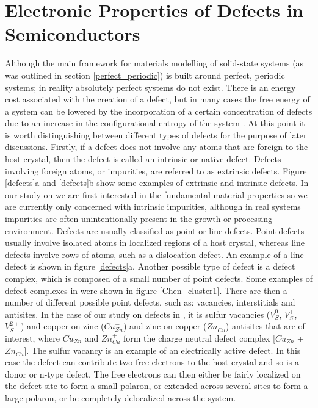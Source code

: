 \section{Electronic Properties of Defects in Semiconductors}
Although the main framework for materials modelling of solid-state systems (as was outlined in section \ref{perfect_periodic}) is built around perfect, periodic systems; in reality absolutely perfect systems do not exist. There is an energy cost associated with the creation of a defect, but in many cases the free energy of a system can be lowered by the incorporation of a certain concentration of defects due to an increase in the configurational entropy of the system \cite{AshcroftMermin_general}. 
At this point it is worth distinguishing between different types of defects for the purpose of later discussions.
Firstly, if a defect does not involve any atoms that are foreign to the host crystal, then the defect is called an intrinsic or native defect. Defects involving foreign atoms, or impurities, are referred to as extrinsic defects. Figure \ref{defects}a and \ref{defects}b show some examples of extrinsic and intrinsic defects. In our study on {\CZTS} we are first interested in the fundamental material properties so we are currently only concerned with intrinsic impurities, although in real systems impurities are often unintentionally present in the growth or processing environment.
Defects are usually classified as point or line defects. Point defects usually involve isolated atoms in localized regions of a host crystal, whereas line defects involve rows of atoms, such as a dislocation defect. An example of a line defect is shown in figure \ref{defects}a. Another possible type of defect is a defect complex, which is composed of a small number of point defects. Some examples of defect complexes in {\CZTS} were shown in figure \ref{Chen_cluster1}. 
There are then a number of different possible point defects, such as: vacancies, interstitials and antisites. In the case of our study on defects in {\CZTS}, it is sulfur vacancies ($V_{S}^{0}$, $V_{S}^{+}$, $V_{S}^{2+}$) and copper-on-zinc ($Cu_{Zn}^{-}$) and zinc-on-copper ($Zn_{Cu}^{+}$) antisites that are of interest, where  $Cu_{Zn}^{-}$ and $Zn_{Cu}^{+}$ form the charge neutral defect complex [$Cu_{Zn}^{-}$ + $Zn_{Cu}^{+}$]. The sulfur vacancy is an example of an electrically active defect. In this case the defect can contribute two free electrons to the host crystal and so is a donor or n-type defect.
The free electrons can then either be fairly localized on the defect site to form a small polaron, or extended across several sites to form a large polaron, or be completely delocalized across the system.

